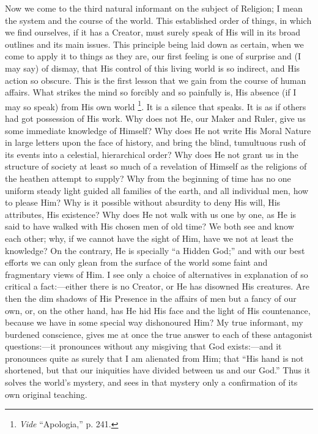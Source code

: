 Now we come to the third natural informant on the subject of
Religion; I mean the system and the course of the world. This
established order of things, in which we find ourselves, if it has a
Creator, must surely speak of His will in its broad outlines and its
main issues. This principle being laid down as certain, when we come
to apply it to things as they are, our first feeling is one of
surprise and (I may say) of dismay, that His control of this living
world is so indirect, and His action so obscure. This is the first
lesson that we gain from the course of human affairs. What strikes the
mind so forcibly and so painfully is, His absence (if I may so
speak) from His own world \footnote{\emph{Vide}
``Apologia,'' p. 241.}.
It is a silence that speaks. It is as if others had got possession of
His work. Why does not He, our Maker and Ruler, give us some immediate
knowledge of Himself? Why does He not write His Moral Nature in large
letters upon the face of history, and bring the blind, tumultuous rush
of its events into a celestial, hierarchical order? Why does He not
grant us in the structure of society at least so much of a revelation
of Himself as the religions of the heathen attempt to supply? Why from
the beginning of time has no one uniform steady light guided all
families of the earth, and all individual men, how to please Him? Why
is it possible without absurdity to deny His will, His attributes, His
existence? Why does He not walk with us one by one, as He is said to
have walked with His chosen men of old time? We both see and know each
other; why, if we cannot have the sight of Him, have we not at least
the knowledge? On the contrary, He is specially ``a Hidden
God;'' and with our best efforts we can only glean from the
surface of the world some faint and fragmentary views of Him. I see
only a choice of alternatives in explanation of so critical a fact:—either
there is no Creator, or He has disowned His creatures. Are then the
dim shadows of His Presence in the affairs of men but a fancy of our
own, or, on the other hand, has He hid His face and the light of His
countenance, because we have in some special way dishonoured Him? My
true informant, my burdened conscience, gives me at once the
true answer to each of these antagonist questions:—it pronounces
without any misgiving that God exists:—and it pronounces quite as
surely that I am alienated from Him; that ``His hand is not
shortened, but that our iniquities have divided between us and our
God.'' Thus it solves the world's mystery, and sees in that
mystery only a confirmation of its own original teaching.


